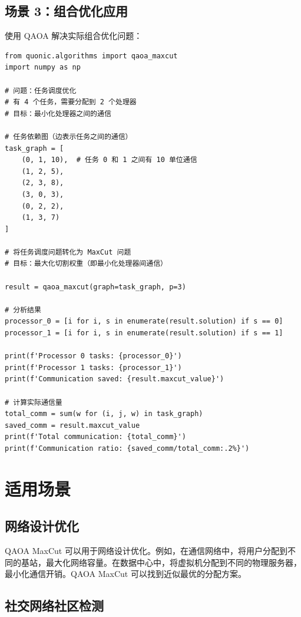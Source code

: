 \documentclass[12pt,a4paper]{article}
\begin{document}
\subsection{场景 3：组合优化应用}

使用 QAOA 解决实际组合优化问题：

\begin{verbatim}
from quonic.algorithms import qaoa_maxcut
import numpy as np

# 问题：任务调度优化
# 有 4 个任务，需要分配到 2 个处理器
# 目标：最小化处理器之间的通信

# 任务依赖图（边表示任务之间的通信）
task_graph = [
    (0, 1, 10),  # 任务 0 和 1 之间有 10 单位通信
    (1, 2, 5),
    (2, 3, 8),
    (3, 0, 3),
    (0, 2, 2),
    (1, 3, 7)
]

# 将任务调度问题转化为 MaxCut 问题
# 目标：最大化切割权重（即最小化处理器间通信）

result = qaoa_maxcut(graph=task_graph, p=3)

# 分析结果
processor_0 = [i for i, s in enumerate(result.solution) if s == 0]
processor_1 = [i for i, s in enumerate(result.solution) if s == 1]

print(f'Processor 0 tasks: {processor_0}')
print(f'Processor 1 tasks: {processor_1}')
print(f'Communication saved: {result.maxcut_value}')

# 计算实际通信量
total_comm = sum(w for (i, j, w) in task_graph)
saved_comm = result.maxcut_value
print(f'Total communication: {total_comm}')
print(f'Communication ratio: {saved_comm/total_comm:.2%}')
\end{verbatim}

\section{适用场景}

\subsection{网络设计优化}

QAOA MaxCut 可以用于网络设计优化。例如，在通信网络中，将用户分配到不同的基站，最大化网络容量。在数据中心中，将虚拟机分配到不同的物理服务器，最小化通信开销。QAOA MaxCut 可以找到近似最优的分配方案。

\subsection{社交网络社区检测}
\end{document}
